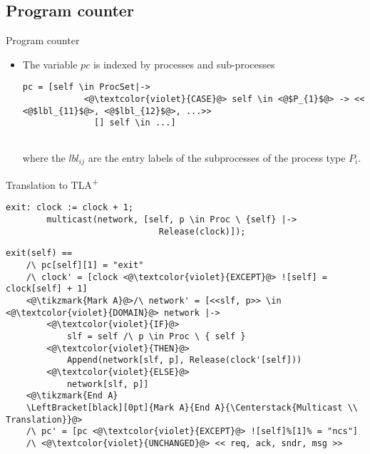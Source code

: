 \documentclass{beamer}
\newcommand{\tikzmark}[1]{%
  \tikz[overlay,remember picture,baseline] \node [anchor=base] (#1) {};}
\newcommand{\tlaplus}{TLA\textsuperscript{+}\xspace}
\begin{document}
\subsection{Program counter}

\begin{frame}[fragile]{Program counter}
    \begin{itemize}
     \item The variable $pc$ is indexed by processes and sub-processes

\medskip

\begin{lstlisting}[language=pluscal, frame = none, numbers = none]
pc = [self \in ProcSet|->
            <@\textcolor{violet}{CASE}@> self \in <@$P_{1}$@> -> << <@$lbl_{11}$@>, <@$lbl_{12}$@>, ...>>
              [] self \in ...]
                    
\end{lstlisting}
	
\medskip

where the $lbl_{ij}$ are the entry labels of the subprocesses of the process type $P_i$.

\end{itemize}
\end{frame}

\begin{frame}[fragile]{Translation to \tlaplus}

\begin{lstlisting}[language=pluscal, frame = tlrb, numbers=none]  
 exit: clock := clock + 1;
        multicast(network, [self, p \in Proc \ {self} |->
                              Release(clock)]);
\end{lstlisting}
\begin{lstlisting}[language=pluscal, frame = tlrb, numbers=none]  
exit(self) == 
    /\ pc[self][1] = "exit"
    /\ clock' = [clock <@\textcolor{violet}{EXCEPT}@> ![self] = clock[self] + 1]
    <@\tikzmark{Mark A}@>/\ network' = [<<slf, p>> \in <@\textcolor{violet}{DOMAIN}@> network |->
        <@\textcolor{violet}{IF}@> 
            slf = self /\ p \in Proc \ { self } 
        <@\textcolor{violet}{THEN}@> 
            Append(network[slf, p], Release(clock'[self])) 
        <@\textcolor{violet}{ELSE}@>
            network[slf, p]]
    <@\tikzmark{End A}
    \LeftBracket[black][0pt]{Mark A}{End A}{\Centerstack{Multicast \\ Translation}}@>
    /\ pc' = [pc <@\textcolor{violet}{EXCEPT}@> ![self]%[1]% = "ncs"]
    /\ <@\textcolor{violet}{UNCHANGED}@> << req, ack, sndr, msg >>
\end{lstlisting}
\end{frame}
\end{document}
